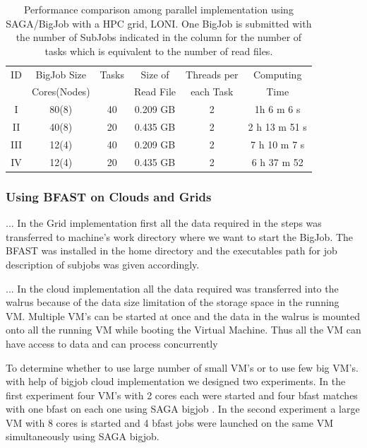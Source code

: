 \documentclass{acm_proc_article-sp}
\begin{document}
 \begin{table}
 \begin{tabular}{|ccccc|c |} 
 \hline 
ID & BigJob Size  &  Tasks & Size of  & Threads per  &  Computing  \\
   & Cores(Nodes) &  & Read File & each Task &  Time\\\hline
I   & 80(8) &  40 & 0.209 GB & 2 & 1h 6 m 6 s \\
II  & 40(8)  &  20 & 0.435 GB & 2 & 2 h 13 m 51 s\\
III & 12(4)  & 40  & 0.209 GB & 2 & 7 h 10 m 7 s \\
IV & 12(4)  & 20 & 0.435 GB & 2 &  6 h 37 m 52  \\
\hline
\end{tabular}
\caption{Performance comparison among parallel implementation using
  SAGA/BigJob with a HPC grid, LONI. One BigJob is submitted with the
  number of SubJobs indicated in the column for the number of tasks
  which is equivalent to the number of read files.  }
  \label{table:bigjob-loni} 
\end{table}


\subsubsection{Using BFAST on Clouds and Grids}

...  In the Grid implementation first all the
data required in the steps was transferred to machine's work directory
where we want to start the BigJob. The BFAST was installed in the home
directory and the executables path for job description of subjobs was
given accordingly.

...  In the cloud implementation all the data
required was transferred into the walrus because of the data size
limitation of the storage space in the running VM. Multiple VM's can
be started at once and the data in the walrus is mounted onto all the
running VM while booting the Virtual Machine. Thus all the VM can have
access to data and can process concurrently


To determine whether to use large number of small VM's or to use few
big VM's. with help of bigjob cloud implementation we designed two
experiments. In the first experiment four VM's with 2 cores each were
started and four bfast matches with one bfast on each one using SAGA
bigjob . In the second experiment a large VM with 8 cores is started
and 4 bfast jobs were launched on the same VM simultaneously using
SAGA bigjob.
\end{document}
